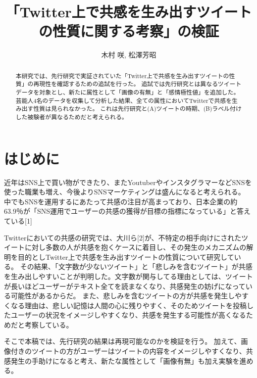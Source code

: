 \documentclass[dvipdfmx]{issj}
\title{「Twitter上で共感を生み出すツイートの性質に関する考察」の検証}
\author{木村 咲\uddag, 松澤芳昭\uddag}
\affiliation{\dag 青山学院大学　社会情報情報学部\ddag }
\begin{document}
\maketitle
\begin{abstract}
本研究では、先行研究で実証されていた「Twitter上で共感を生み出すツイートの性質」の再現性を確認するための追試を行った。 追試では先行研究とは異なるツイートデータを対象とし、新たに属性として「画像の有無」と「感情極性値」を追加した。 芸能人4名のデータを収集して分析した結果、全ての属性においてTwitterで共感を生み出す性質は見られなかった。 これは先行研究と(A)ツイートの時期、(B)ラベル付けした被験者が異なるためだと考えられる。
\end{abstract}
\section{はじめに} %

近年はSNS上で買い物ができたり、またYoutuberやインスタグラマーなどSNSを使った職業も増え、今後よりSNSマーケティングは盛んになると考えられる。
中でもSNSを運用するにあたって共感の注目が高まっており、日本企業の約63.9％が「SNS運用でユーザーの共感の獲得が目標の指標になっている」と答えている[1]

Twitterにおいての共感の研究では、大川ら[2]が、不特定の相手向けにされたツイートに対し多数の人が共感を抱くケースに着目し、その発生のメカニズムの解明を目的としTwitter上で共感を生み出すツイートの性質について研究している。
その結果、「文字数が少ないツイート」と「悲しみを含むツイート」が共感を生み出しやすいことが判明した。文字数が関与してる理由としては、ツイートが長いほどユーザーがテキスト全てを読まなくなり、共感発生の妨げになっている可能性があるからだ。
また、悲しみを含むツイートの方が共感を発生しやすくなる理由は、悲しい記憶は人間の心に残りやすく、そのためツイートを投稿したユーザーの状況をイメージしやすくなり、共感を発生する可能性が高くなるためだと考察している。

そこで本稿では、先行研究の結果は再現可能なのかを検証を行う。
加えて、画像付きのツイートの方がユーザーはツイートの内容をイメージしやすくなり、共感発生の手助けになると考え、新たな属性として「画像有無」も加え実験を進める。




\end{document}

